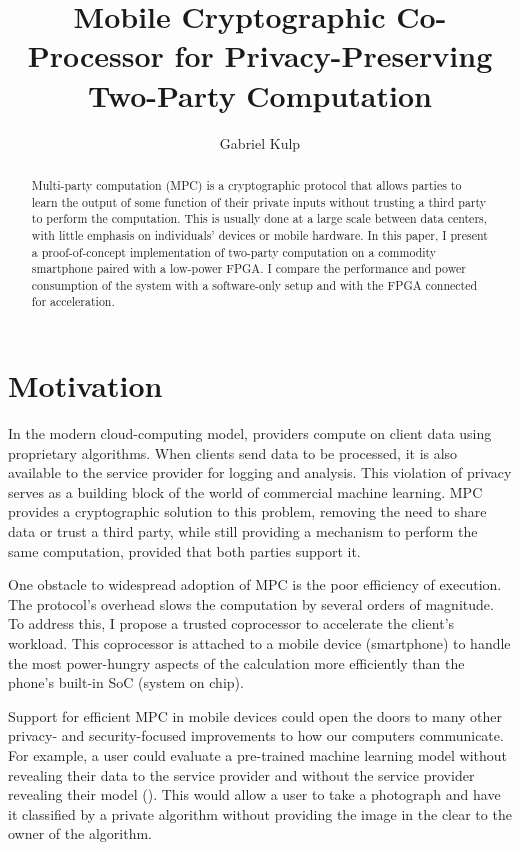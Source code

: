 \documentclass[letterpaper]{article}
\author{Gabriel Kulp}
\title{Mobile Cryptographic Co-Processor for Privacy-Preserving Two-Party Computation}
\begin{document}
\maketitle

\nocite{YaoGC,FirstOT,Fairplay,FreeXOR,HalfGates,TinyGarble,NeuralNets}

\begin{abstract}
Multi-party computation (MPC) is a cryptographic protocol that allows parties to learn the output of some function of their private inputs without trusting a third party to perform the computation. This is usually done at a large scale between data centers, with little emphasis on individuals' devices or mobile hardware. In this paper, I present a proof-of-concept implementation of two-party computation on a commodity smartphone paired with a low-power FPGA\@. I compare the performance and power consumption of the system with a software-only setup and with the FPGA connected for acceleration.
\end{abstract}

\section{Motivation}
In the modern cloud-computing model, providers compute on client data using proprietary algorithms. When clients send data to be processed, it is also available to the service provider for logging and analysis. This violation of privacy serves as a building block of the world of commercial machine learning. MPC provides a cryptographic solution to this problem, removing the need to share data or trust a third party, while still providing a mechanism to perform the same computation, provided that both parties support it.

One obstacle to widespread adoption of MPC is the poor efficiency of execution. The protocol's overhead slows the computation by several orders of magnitude. To address this, I propose a trusted coprocessor to accelerate the client's workload. This coprocessor is attached to a mobile device (smartphone) to handle the most power-hungry aspects of the calculation more efficiently than the phone's built-in SoC (system on chip).

Support for efficient MPC in mobile devices could open the doors to many other privacy- and security-focused improvements to how our computers communicate. For example, a user could evaluate a pre-trained machine learning model without revealing their data to the service provider and without the service provider revealing their model (\cite{NeuralNets}). This would allow a user to take a photograph and have it classified by a private algorithm without providing the image in the clear to the owner of the algorithm.
\end{document}
